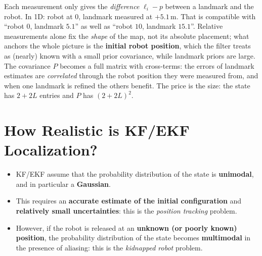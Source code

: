 \documentclass[11pt,a4paper]{article}
\def\bm#1{#1}%
\newcommand{\slides}[1]{\texorpdfstring{\hspace{0.5em}{\normalfont\small\emph{(#1)}}}{}}
\theoremstyle{definition}
\theoremstyle{plain}
\theoremstyle{remark}
\begin{document}
\begin{intuition}
Each measurement only gives the \emph{difference} $\bm\ell_i-\bm p$ between a landmark and the robot. In 1D: robot at $0$, landmark measured at $+5.1$\,m. That is compatible with ``robot $0$, landmark $5.1$'' as well as ``robot $10$, landmark $15.1$''. Relative measurements alone fix the \emph{shape} of the map, not its absolute placement; what anchors the whole picture is the \textbf{initial robot position}, which the filter treats as (nearly) known with a small prior covariance, while landmark priors are large. The covariance $\bm P$ becomes a full matrix with cross-terms: the errors of landmark estimates are \emph{correlated} through the robot position they were measured from, and when one landmark is refined the others benefit. The price is the size: the state has $2+2L$ entries and $\bm P$ has $(2+2L)^2$.
\end{intuition}

\section{How Realistic is KF/EKF Localization?}
\slides{slides 24--25}

\begin{itemize}
  \item KF/EKF assume that the probability distribution of the state is \textbf{unimodal}, and in particular a \textbf{Gaussian}.
  \item This requires an \textbf{accurate estimate of the initial configuration} and \textbf{relatively small uncertainties}: this is the \emph{position tracking} problem.
  \item However, if the robot is released at an \textbf{unknown (or poorly known) position}, the probability distribution of the state becomes \textbf{multimodal} in the presence of aliasing: this is the \emph{kidnapped robot} problem.
\end{itemize}
\end{document}
